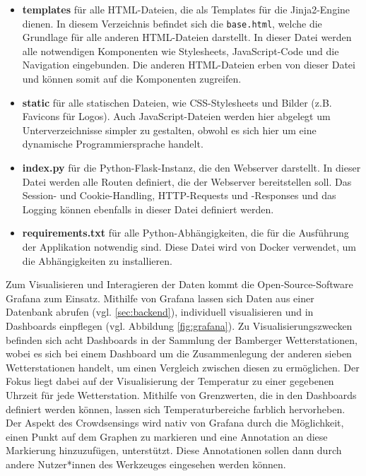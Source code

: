 \begin{itemize}
    \item \textbf{templates} für alle HTML-Dateien, die als Templates für die Jinja2-Engine dienen. In diesem Verzeichnis befindet sich die \texttt{base.html}, welche die Grundlage für alle anderen HTML-Dateien darstellt. In dieser Datei werden alle notwendigen Komponenten wie Stylesheets, JavaScript-Code und die Navigation eingebunden. Die anderen HTML-Dateien erben von dieser Datei und können somit auf die Komponenten zugreifen.
    \item \textbf{static} für alle statischen Dateien, wie CSS-Stylesheets und Bilder (z.B. Favicons für Logos). Auch JavaScript-Dateien werden hier abgelegt um Unterverzeichnisse simpler zu gestalten, obwohl es sich hier um eine dynamische Programmiersprache handelt.
    \item \textbf{index.py} für die Python-Flask-Instanz, die den Webserver darstellt. In dieser Datei werden alle Routen definiert, die der Webserver bereitstellen soll. Das Session- und Cookie-Handling, HTTP-Requests und -Responses und das Logging können ebenfalls in dieser Datei definiert werden.
    \item \textbf{requirements.txt} für alle Python-Abhängigkeiten, die für die Ausführung der Applikation notwendig sind. Diese Datei wird von Docker verwendet, um die Abhängigkeiten zu installieren.
\end{itemize}

Zum Visualisieren und Interagieren der Daten kommt die Open-Source-Software Grafana zum Einsatz. Mithilfe von Grafana lassen sich Daten aus einer Datenbank abrufen (vgl. \ref{sec:backend}), individuell visualisieren und in Dashboards einpflegen (vgl. Abbildung \ref{fig:grafana}). Zu Visualisierungszwecken befinden sich acht Dashboards in der Sammlung der Bamberger Wetterstationen, wobei es sich bei einem Dashboard um die Zusammenlegung der anderen sieben Wetterstationen handelt, um einen Vergleich zwischen diesen zu ermöglichen. Der Fokus liegt dabei auf der Visualisierung der Temperatur zu einer gegebenen Uhrzeit für jede Wetterstation. Mithilfe von Grenzwerten, die in den Dashboards definiert werden können, lassen sich Temperaturbereiche farblich hervorheben. Der Aspekt des Crowdsensings wird nativ von Grafana durch die Möglichkeit, einen Punkt auf dem Graphen zu markieren und eine Annotation an diese Markierung hinzuzufügen, unterstützt. Diese Annotationen sollen dann durch andere Nutzer*innen des Werkzeuges eingesehen werden können.

